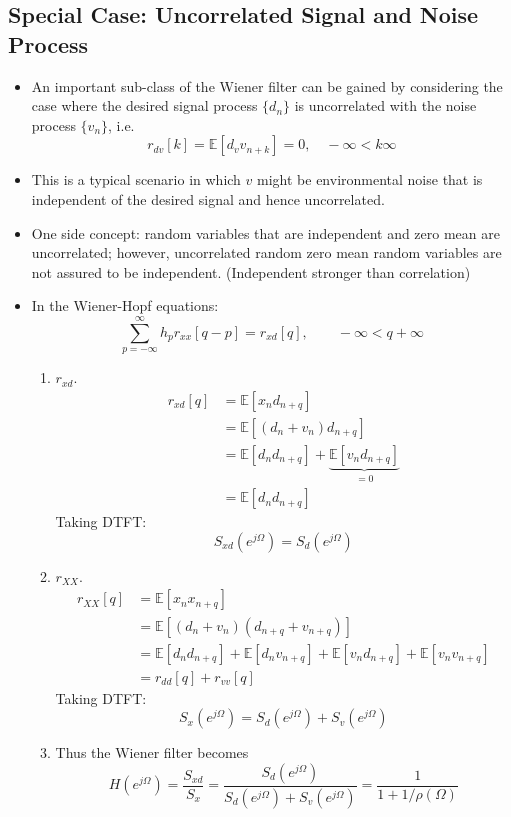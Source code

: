 \documentclass[12pt]{article}
\newcommand{\mexp}{\mathbb{E}}
\newcommand{\summ}[2]{\sum_{#1}^{#2}}
\newcommand{\sumpinfinf}{\summ{p=-\infty}{\infty}}
\newcommand{\proc}[1]{\{ #1_n\}}
\newcommand{\autocox}{r_{xx}}
\begin{document}
\subsection{Special Case: Uncorrelated Signal and Noise Process}
\begin{itemize}
    \item An important sub-class of the Wiener filter can be gained by considering the case where the desired signal process $\proc{d}$ is uncorrelated with the noise process $\proc{v}$, i.e.
    \[
    r_{dv}[k] = \mexp[d_v v_{n+k}] = 0,\quad -\infty < k \infty
    \]
    \item This is a typical scenario in which $v$ might be environmental noise that is independent of the desired signal and hence uncorrelated.
    \item One side concept: random variables that are independent and zero mean are uncorrelated; however, uncorrelated random zero mean random variables are not assured to be independent. (Independent stronger than correlation)
    \item In the Wiener-Hopf equations:
    \[
    \sumpinfinf h_p \autocox[q-p] = r_{xd}[q], \qquad -\infty < q +\infty 
    \]
    \begin{enumerate}
        \item $r_{xd}$.
        \begin{align*}
            r_{xd}[q] &= \mexp[x_n d_{n+q}]  \\
            &= \mexp[(d_n + v_n)d_{n+q}] \\
            &= \mexp[d_n d_{n+q}] + \underbrace{\mexp[v_n d_{n+q}]}_{=0} \\
            &= \mexp[d_n d_{n+q}]
        \end{align*}
        Taking DTFT:
        \[
        S_{xd}(e^{j\Omega}) = S_{d}(e^{j\Omega})
        \]
        \item $r_{XX}$.
        \begin{align*}
            r_{XX}[q] &= \mexp[x_n x_{n+q}] \\
            &= \mexp[(d_n + v_n)(d_{n+q}+ v_{n+q})] \\
            &= \mexp[d_n d_{n+q}] + \mexp[d_n v_{n+q} ] + \mexp[v_n d_{n+q}] + \mexp[v_n v_{n+q}] \\
            &= r_{dd}[q] + r_{vv}[q] 
        \end{align*}
        Taking DTFT:
        \[
        S_x(e^{j\Omega}) = S_d(e^{j\Omega}) + S_v(e^{j\Omega})
        \]
        \item Thus the Wiener filter becomes
        \begin{equation}
            H(e^{j\Omega}) = \frac{S_{xd}}{S_x} =\frac{S_d(e^{j\Omega})}{S_d(e^{j\Omega}) + S_v(e^{j\Omega})} = \frac{1}{1 + 1/\rho(\Omega)}
            \label{Eq:Wie_SNR}
        \end{equation}
        


\end{enumerate}
\end{itemize}
\end{document}
